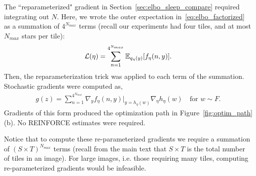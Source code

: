 The ``reparameterized" gradient in Section~\ref{sec:elbo_sleep_compare} required integrating out $N$.
Here, we wrote the outer expectation in~\eqref{eq:elbo_factorized} as a summation of $4^{N_{max}}$ terms (recall our experiments had four tiles, and at most $N_{max}$ stars per tile):
\begin{align}
\mathcal{L}(\eta) = \sum_{n=1}^{4^{N_{max}}}\mathbb{E}_{q_\eta(y)}[f_\eta(n, y)].
\end{align}
Then, the reparameterization trick was applied to each term of the summation.
Stochastic gradients were computed as,
\begin{align}
g(z) = \sum_{n=1}^{4^{N_{max}}}\nabla_y f_\eta(n, y)\Big|_{y = h_\eta(w)}
\nabla_\eta h_\eta(w) \quad \text{for } w\sim F.
\end{align}
Gradients of this form produced the optimization path in Figure~\ref{fig:optim_path}(b).
No REINFORCE estimates were required. 

Notice that to compute these re-parameterized gradients we require 
a summation of $(S \times T)^{N_{max}}$ terms 
(recall from the main text that $S \times T$ is the total number 
of tiles in an image). 
For large images, i.e. those requiring many tiles, computing re-parameterized gradients would be infeasible. 

